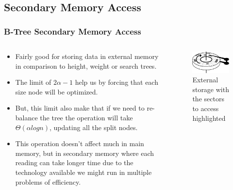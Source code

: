 \documentclass{beamer}
\begin{document}
\begin{frame}
    \subsection{Secondary Memory Access}
    \frametitle{B-Tree Secondary Memory Access}
    \begin{columns}
        \begin{column}{.7\textwidth}
            \begin{block}{}
                \begin{itemize}
                    \item Fairly good for storing data in external memory in comparison to height, weight or search trees.
                    \item The limit of \(2\alpha - 1\) help us by forcing that each size node will be optimized.
                    \item But, this limit also make that if we need to re-balance the tree the 
                        operation will take \(\Theta\left(\alpha log n\right)\), updating all the split nodes.
                    \item This operation doesn't affect much in main memory, but in secondary memory where each reading can take longer time due to the technology available we might run in multiple problems of efficiency.
                \end{itemize}
            \end{block}
        \end{column}
        \begin{column}{.35\textwidth}
            \begin{block}{}
                \begin{figure}[h!]
                    \includegraphics[width=\linewidth]{resources/made/external_storage_wblocks.eps}
                    \caption{External storage with the sectors to access highlighted}
                \end{figure}
            \end{block}
        \end{column}
    \end{columns}
\end{frame}
   
\end{document}
